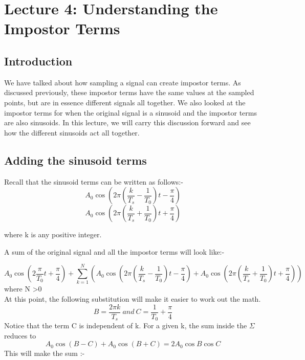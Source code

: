 \section{Lecture 4: Understanding the Impostor Terms}

\subsection{Introduction}
We have talked about how sampling a signal can create impostor terms. As discussed previously, these impostor terms have the same values at the sampled points, but are in essence different signals all together. We also looked at the impostor terms for when the original signal is a sinusoid and the impostor terms are also sinusoids. In this lecture, we will carry this discussion forward and see how the different sinusoids act all together.

\subsection{Adding the sinusoid terms}
\noindent Recall that the sinusoid terms can be written as follows:-
\[
A_{0} \cos \left (2\pi(\frac{k}{T_{s}}-\frac{1}{T_{0}})t - \frac{\pi}{4}\right)
\]
\[
A_{0} \cos \left (2\pi(\frac{k}{T_{s}}+\frac{1}{T_{0}})t + \frac{\pi}{4}\right)
\]

\noindent where k is any positive integer.

\noindent A sum of the original signal and all the impostor terms will look like:-

\[
A_{0} \cos \left (2\frac{\pi}{T_{0}}t+\frac{\pi}{4}\right) + \sum_{k=1}^{N}\left( A_{0} \cos \left (2\pi(\frac{k}{T_{s}}-\frac{1}{T_{0}})t - \frac{\pi}{4}\right)+ A_{0} \cos \left (2\pi(\frac{k}{T_{s}}+\frac{1}{T_{0}})t + \frac{\pi}{4}\right)\right)
\]
where N \textgreater 0
\\
At this point, the following substitution will make it easier to work out the math.
\[
B=\frac{2\pi k}{T_{s}}
\ and
\
C=\frac{1}{T_{0}} + \frac{\pi}{4}
\]
 Notice that the term C is independent of k.
 For a given k, the sum inside the $\Sigma$ reduces to 
\[ A_{0}\cos (B-C) + A_{0}\cos (B+C) = 2A_{0}\cos B\cos C
\]
This will make the sum :-

